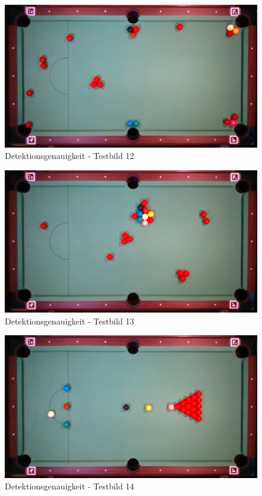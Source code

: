 \begin{figure}[h!]
    \begin{center}
        \includegraphics[width=0.8\linewidth]{../common/07_appendix/resources/00_detection/11_detektion_testbild_12.png}
    \end{center}
    \caption{Detektionsgenauigkeit - Testbild 12}
    \label{fig:detektionsgenauigkeit:testbild:12}
\end{figure}
\begin{figure}[h!]
    \begin{center}
        \includegraphics[width=0.8\linewidth]{../common/07_appendix/resources/00_detection/12_detektion_testbild_13.png}
    \end{center}
    \caption{Detektionsgenauigkeit - Testbild 13}
    \label{fig:detektionsgenauigkeit:testbild:13}
\end{figure}
\begin{figure}[h!]
    \begin{center}
        \includegraphics[width=0.8\linewidth]{../common/07_appendix/resources/00_detection/13_detektion_testbild_14.png}
    \end{center}
    \caption{Detektionsgenauigkeit - Testbild 14}
    \label{fig:detektionsgenauigkeit:testbild:14}
\end{figure}
